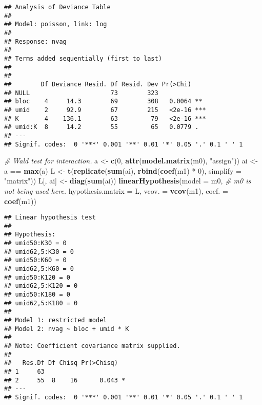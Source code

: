 \documentclass[9pt,a5paper,]{book}
\newenvironment{Shaded}{}{}
\newcommand{\KeywordTok}[1]{\textbf{{#1}}}
\newcommand{\DataTypeTok}[1]{\underline{{#1}}}
\newcommand{\DecValTok}[1]{{#1}}
\newcommand{\StringTok}[1]{{#1}}
\newcommand{\CommentTok}[1]{\textit{{#1}}}
\newcommand{\NormalTok}[1]{{#1}}
\renewenvironment{Shaded}{\color{inputcolor}}{}
\renewcommand{\DataTypeTok}[1]{{#1}}
\theoremstyle{definition}
\theoremstyle{definition}
\theoremstyle{remark}
\begin{document}
\begin{verbatim}
## Analysis of Deviance Table
## 
## Model: poisson, link: log
## 
## Response: nvag
## 
## Terms added sequentially (first to last)
## 
## 
##        Df Deviance Resid. Df Resid. Dev Pr(>Chi)    
## NULL                      73        323             
## bloc    4     14.3        69        308   0.0064 ** 
## umid    2     92.9        67        215   <2e-16 ***
## K       4    136.1        63         79   <2e-16 ***
## umid:K  8     14.2        55         65   0.0779 .  
## ---
## Signif. codes:  0 '***' 0.001 '**' 0.01 '*' 0.05 '.' 0.1 ' ' 1
\end{verbatim}

\begin{Shaded}
\begin{Highlighting}[]
\CommentTok{# Wald test for interaction.}
\NormalTok{a <-}\StringTok{ }\KeywordTok{c}\NormalTok{(}\DecValTok{0}\NormalTok{, }\KeywordTok{attr}\NormalTok{(}\KeywordTok{model.matrix}\NormalTok{(m0), }\StringTok{"assign"}\NormalTok{))}
\NormalTok{ai <-}\StringTok{ }\NormalTok{a ==}\StringTok{ }\KeywordTok{max}\NormalTok{(a)}
\NormalTok{L <-}\StringTok{ }\KeywordTok{t}\NormalTok{(}\KeywordTok{replicate}\NormalTok{(}\KeywordTok{sum}\NormalTok{(ai), }\KeywordTok{rbind}\NormalTok{(}\KeywordTok{coef}\NormalTok{(m1) *}\StringTok{ }\DecValTok{0}\NormalTok{), }\DataTypeTok{simplify =} \StringTok{"matrix"}\NormalTok{))}
\NormalTok{L[, ai] <-}\StringTok{ }\KeywordTok{diag}\NormalTok{(}\KeywordTok{sum}\NormalTok{(ai))}
\KeywordTok{linearHypothesis}\NormalTok{(}\DataTypeTok{model =} \NormalTok{m0, }\CommentTok{# m0 is not being used here.}
                 \DataTypeTok{hypothesis.matrix =} \NormalTok{L,}
                 \DataTypeTok{vcov. =} \KeywordTok{vcov}\NormalTok{(m1),}
                 \DataTypeTok{coef. =} \KeywordTok{coef}\NormalTok{(m1))}
\end{Highlighting}
\end{Shaded}

\begin{verbatim}
## Linear hypothesis test
## 
## Hypothesis:
## umid50:K30 = 0
## umid62,5:K30 = 0
## umid50:K60 = 0
## umid62,5:K60 = 0
## umid50:K120 = 0
## umid62,5:K120 = 0
## umid50:K180 = 0
## umid62,5:K180 = 0
## 
## Model 1: restricted model
## Model 2: nvag ~ bloc + umid * K
## 
## Note: Coefficient covariance matrix supplied.
## 
##   Res.Df Df Chisq Pr(>Chisq)  
## 1     63                      
## 2     55  8    16      0.043 *
## ---
## Signif. codes:  0 '***' 0.001 '**' 0.01 '*' 0.05 '.' 0.1 ' ' 1
\end{verbatim}
\end{document}

